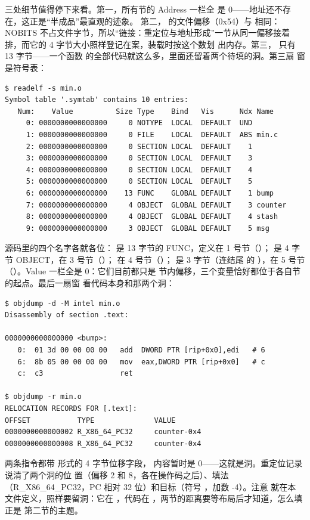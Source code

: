 三处细节值得停下来看。第一，所有节的 Address 一栏全
是 0——地址还不存在，这正是“半成品”最直观的迹象。
第二， 的文件偏移（0x54）与 
相同：NOBITS 不占文件字节，所以“链接：重定位与地址形成”一节从同一偏移接着
排，而它的 4 字节大小照样登记在案，装载时按这个数划
出内存。第三， 只有 13 字节——一个函数
的全部代码就这么多，里面还留着两个待填的洞。第三扇
窗是符号表：

\begin{lstlisting}
$ readelf -s min.o
Symbol table '.symtab' contains 10 entries:
   Num:    Value          Size Type    Bind   Vis      Ndx Name
     0: 0000000000000000     0 NOTYPE  LOCAL  DEFAULT  UND
     1: 0000000000000000     0 FILE    LOCAL  DEFAULT  ABS min.c
     2: 0000000000000000     0 SECTION LOCAL  DEFAULT    1
     3: 0000000000000000     0 SECTION LOCAL  DEFAULT    3
     4: 0000000000000000     0 SECTION LOCAL  DEFAULT    4
     5: 0000000000000000     0 SECTION LOCAL  DEFAULT    5
     6: 0000000000000000    13 FUNC    GLOBAL DEFAULT    1 bump
     7: 0000000000000000     4 OBJECT  GLOBAL DEFAULT    3 counter
     8: 0000000000000000     4 OBJECT  GLOBAL DEFAULT    4 stash
     9: 0000000000000000     3 OBJECT  GLOBAL DEFAULT    5 msg
\end{lstlisting}

源码里的四个名字各就各位： 是 13 字节的
FUNC，定义在 1 号节（）； 是
4 字节 OBJECT，在 3 号节（）；
在 4 号节（）； 是 3 字节（连结尾
的 ），在 5 号节
（）。Value 一栏全是 0：它们目前都只是
节内偏移，三个变量恰好都位于各自节的起点。最后一扇窗
看代码本身和那两个洞：

\begin{lstlisting}
$ objdump -d -M intel min.o
Disassembly of section .text:

0000000000000000 <bump>:
   0:  01 3d 00 00 00 00   add  DWORD PTR [rip+0x0],edi   # 6
   6:  8b 05 00 00 00 00   mov  eax,DWORD PTR [rip+0x0]   # c
   c:  c3                  ret

$ objdump -r min.o
RELOCATION RECORDS FOR [.text]:
OFFSET           TYPE              VALUE
0000000000000002 R_X86_64_PC32     counter-0x4
0000000000000008 R_X86_64_PC32     counter-0x4
\end{lstlisting}

两条指令都带 \code{[rip+0x0]} 形式的 4 字节位移字段，
内容暂时是 0——这就是洞。重定位记录说清了两个洞的位
置（偏移 2 和 8，各在操作码之后）、填法
（R\_X86\_64\_PC32，PC 相对 32 位）和目标（符号
，加数 -4）。注意  就在本
文件定义，照样要留洞：它在 ，代码在
，两节的距离要等布局后才知道，怎么填正是
第二节的主题。

